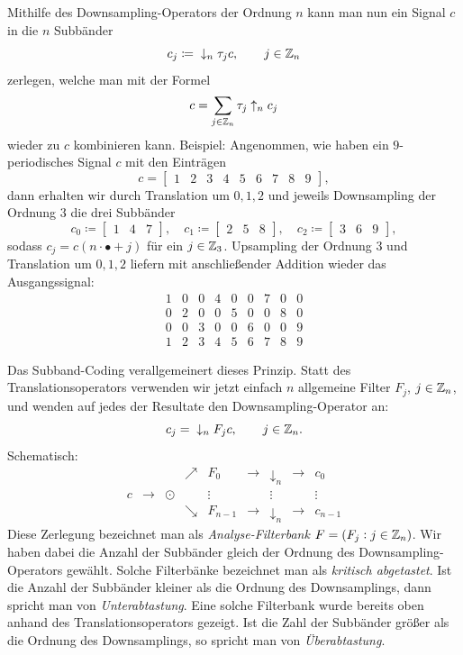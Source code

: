 Mithilfe des Downsampling-Operators der Ordnung $ n $ kann man nun ein Signal $ c $ in die $ n $ 
Subbänder
\[
  c_{j} \coloneqq{} \downarrow_{n} \tau_{j} c, \qquad j \in \mathbb{Z}_{n}
\]
zerlegen, welche man mit der Formel
\[
  c = \sum_{j \in \mathbb{Z}_{n}} \tau_{j} \uparrow_{n} c_{j}
\]
wieder zu $ c $ kombinieren kann. Beispiel: Angenommen, wie haben ein $ 9 $-periodisches Signal
$ c $ mit den Einträgen
\[
  c = \begin{bmatrix} 1 & 2 & 3 & 4 & 5 & 6 & 7 & 8 & 9 \end{bmatrix},
\]
dann erhalten wir durch Translation um $ 0,1,2 $ und jeweils Downsampling der Ordnung $ 3 $ die 
drei Subbänder
\[
c_{0} \coloneqq \begin{bmatrix} 1 & 4 & 7 \end{bmatrix}, \quad
c_{1} \coloneqq \begin{bmatrix} 2 & 5 & 8 \end{bmatrix}, \quad
c_{2} \coloneqq \begin{bmatrix} 3 & 6 & 9 \end{bmatrix},
\]
sodass $ c_{j} = c(n \cdot \bullet + j) $ für ein $ j \in \mathbb{Z}_{3} $.
Upsampling der Ordnung $ 3 $ und Translation um $ 0,1,2 $ liefern mit anschließender Addition wieder
das Ausgangssignal:
\[
  \begin{array}{*{9}{c}}
  1 & 0 & 0 & 4 & 0 & 0 & 7 & 0 & 0 \\
  0 & 2 & 0 & 0 & 5 & 0 & 0 & 8 & 0 \\
  0 & 0 & 3 & 0 & 0 & 6 & 0 & 0 & 9 \\ \hline
  1 & 2 & 3 & 4 & 5 & 6 & 7 & 8 & 9
  \end{array}
\]

Das Subband-Coding verallgemeinert dieses Prinzip. Statt des Translationsoperators verwenden wir
jetzt einfach $ n $ allgemeine Filter $ F_{j} $, $ j \in \mathbb{Z}_{n} $, und wenden auf jedes der 
Resultate den Downsampling-Operator an:
\[
  c_{j} ={} \downarrow_{n} F_{j} c, \qquad j \in \mathbb{Z}_{n}.
\]
Schematisch:
\[
  \begin{array}{*{9}{c}}
  & & & \nearrow & \boxed{F_{0}} & \rightarrow & \boxed{\downarrow_{n}} & \rightarrow & c_{0} \\
  c & \rightarrow & \odot & & \vdots & & \vdots & & \vdots \\
  & & & \searrow & \boxed{F_{n-1}} & \rightarrow & \boxed{\downarrow_{n}} & \rightarrow & c_{n-1}
  \end{array}
\]
Diese Zerlegung bezeichnet man als \emph{Analyse-Filterbank} $ F = (F_{j} : j \in \mathbb{Z}_{n}) $. Wir 
haben dabei die Anzahl der Subbänder gleich der Ordnung des Downsampling-Operators gewählt. Solche
Filterbänke bezeichnet man als \emph{kritisch abgetastet}. Ist die Anzahl der Subbänder kleiner als
die Ordnung des Downsamplings, dann spricht man von \emph{Unterabtastung}. Eine solche Filterbank
wurde bereits oben anhand des Translationsoperators gezeigt. Ist die Zahl der Subbänder größer als
die Ordnung des Downsamplings, so spricht man von \emph{Überabtastung}.

